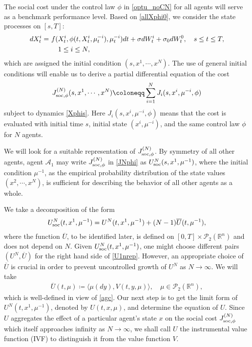 \documentclass{amsart}
\theoremstyle{definition}
\theoremstyle{remark}
\def\cal{\mathcal}
\numberwithin{equation}{section}
\begin{document}
The social cost under the control law $\phi$ in \eqref{optu_noCN} for all agents will   serve as a benchmark performance level.
Based on \eqref{allXphi0},  we consider the state processes
on $[s,T]$:
\begin{align}
dX_t^i=\ & f(X_t^i, \phi(t,X_t^i,\mu_t^{-i}) , \mu_t^{-i}) dt +
 \sigma dW_t^i+\sigma_0 dW_t^0 , \quad s\le t\le T, \label{Xphis}  \\
& \quad 1\le i\le N, \notag
\end{align}
which are assigned  the initial condition $(s, x^1,\cdots, x^N)$.  The use of  general initial conditions will enable us to derive a partial differential equation of the cost
\begin{align} \label{JNphi}
J^{(N)}_{\rm soc, \phi}(s, x^1, \cdots, x^N)\coloneqq  \sum_{i=1}^NJ_i(s,x^i, \mu^{-i}, \phi)
\end{align}
subject to  dynamics  \eqref{Xphis}. Here $J_i(s, x^i,\mu^{-i}, \phi)$ means that the cost is evaluated with initial time $s$, initial state $(x^i, \mu^{-i})$, and the same control law $\phi$ for $N$ agents.

 We will look for a suitable representation of $J_{\rm soc, \phi}^{(N)}$.
By symmetry of all other agents,  agent ${\cal A}_1$ may write $J_{\rm soc, \phi}^{(N)}$  in \eqref{JNphi} as
$U^{N}_{\rm soc }(s, x^1, \mu^{-1})$, where the initial condition $\mu^{-1}$, as the empirical  probability distribution of the state values
$(x^2, \cdots, x^N   )  $, is sufficient for describing the behavior of all other agents as a whole.

We take a decomposition of the form
\begin{align}
U^{N}_{\rm soc }(t,x^1, \mu^{-1})= U^N(t, x^1, \mu^{-1}) + (N-1) \overline U(t, \mu^{-1}),
\label{U1nrep}
\end{align}
where the function $\overline U$, to be identified later,  is defined on $[0,T]\times {\mathcal P}_2({\mathbb R}^n)$ and does not depend on $N$.
Given  $U_{\rm soc }^{N}(t, x^1, \mu^{-1})$, one might choose different pairs $(U^N, \overline U)$ for the right hand side of
\eqref{U1nrep}. However, an appropriate choice of $\overline U$ is crucial in order to prevent uncontrolled growth of $U^N$ as $N\to \infty$. We  will take
\begin{align}
\overline U (t, \mu)\coloneqq \langle \mu(dy), V(t, y, \mu) \rangle, \quad
\mu\in {\cal P}_2(\mathbb{R}^n),
\label{defUUb}
\end{align}
which is well-defined in view of \eqref{agc}.
Our next step is to get the limit form of $U^N(t, x^1, \mu^{-1})$, denoted by $U(t, x, \mu)$, and determine the equation of $U$. Since $U$ aggregates the effect of a particular agent's state $x$ on the social cost $J_{\rm soc, \phi}^{(N)}$  which itself approaches infinity as $N\to \infty$, we shall call $U$ the instrumental value function (IVF) to distinguish it from the  value function $V$.
\end{document}
